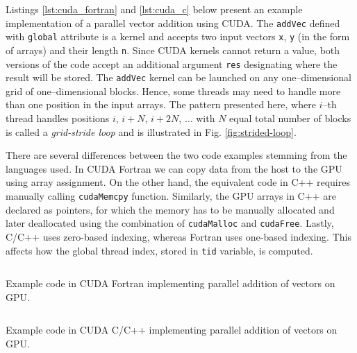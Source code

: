 \begin{example}
  Listings \ref{lst:cuda_fortran} and \ref{lst:cuda_c} below present an example
  implementation of a parallel vector addition using CUDA. The \texttt{addVec}
  defined with \texttt{global} attribute is a kernel and accepts two input
  vectors \texttt{x}, \texttt{y} (in the form of arrays) and their length
  \texttt{n}. Since CUDA kernels cannot return a value, both versions of the code
  accept an additional argument \texttt{res} designating where the result will be
  stored. The \texttt{addVec} kernel can be launched on any one--dimensional grid
  of one--dimensional blocks. Hence, some threads may need to handle more than
  one position in the input arrays. The pattern presented here, where $i$--th
  thread handles positions $i$, $i+N$, $i+2N$, $\ldots$ with $N$ equal total
  number of blocks is called a \emph{grid-stride loop} and is illustrated in Fig.
  \ref{fig:strided-loop}.

  There are several differences between the two code examples stemming from the
  languages used. In CUDA Fortran we can copy data from the host to the GPU using
  array assignment. On the other hand, the equivalent code in C++ requires
  manually calling \texttt{cudaMemcpy} function. Similarly, the GPU arrays in C++
  are declared as pointers, for which the memory has to be manually allocated and
  later deallocated using the combination of \texttt{cudaMalloc} and
  \texttt{cudaFree}. Lastly, C/C++ uses zero-based indexing, whereas Fortran uses
  one-based indexing. This affects how the global thread index, stored in \texttt{tid}
  variable, is computed.

  \begin{listing}
    \inputminted{fortran}{code/cuda_fortran.cuf}
    \caption{Example code in CUDA Fortran implementing parallel addition of vectors on GPU.}
    \label{lst:cuda_fortran}
  \end{listing}

  \begin{listing}
    \inputminted[fontsize=\footnotesize]{cuda}{code/cuda_c.cu}
    \caption{Example code in CUDA C/C++ implementing parallel addition of vectors on GPU.}
    \label{lst:cuda_c}
  \end{listing}


\end{example}
